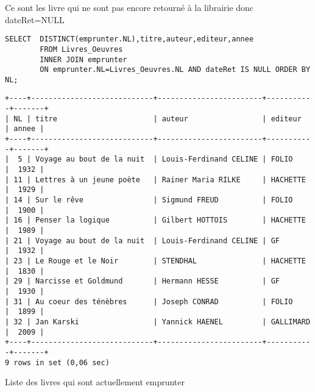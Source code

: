 \documentclass{article}
\begin{document}
Ce sont les livre qui ne sont pas encore retourné à la librairie donc dateRet=NULL
\begin{listing}[H]
	\begin{verbatim}
SELECT 	DISTINCT(emprunter.NL),titre,auteur,editeur,annee 
		FROM Livres_Oeuvres
		INNER JOIN emprunter 
		ON emprunter.NL=Livres_Oeuvres.NL AND dateRet IS NULL ORDER BY NL;
\end{verbatim}
	\begin{verbatim}
+----+----------------------------+------------------------+-----------+-------+
| NL | titre                      | auteur                 | editeur   | annee |
+----+----------------------------+------------------------+-----------+-------+
|  5 | Voyage au bout de la nuit  | Louis-Ferdinand CELINE | FOLIO     |  1932 |
| 11 | Lettres à un jeune poète   | Rainer Maria RILKE     | HACHETTE  |  1929 |
| 14 | Sur le rêve                | Sigmund FREUD          | FOLIO     |  1900 |
| 16 | Penser la logique          | Gilbert HOTTOIS        | HACHETTE  |  1989 |
| 21 | Voyage au bout de la nuit  | Louis-Ferdinand CELINE | GF        |  1932 |
| 23 | Le Rouge et le Noir        | STENDHAL               | HACHETTE  |  1830 |
| 29 | Narcisse et Goldmund       | Hermann HESSE          | GF        |  1930 |
| 31 | Au coeur des ténèbres      | Joseph CONRAD          | FOLIO     |  1899 |
| 32 | Jan Karski                 | Yannick HAENEL         | GALLIMARD |  2009 |
+----+----------------------------+------------------------+-----------+-------+
9 rows in set (0,06 sec)
\end{verbatim}
	\caption{Liste des livres qui sont actuellement emprunter}
\end{listing}
\end{document}
